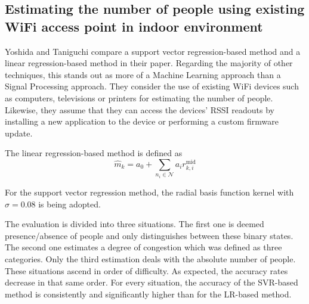 \documentclass[conference]{IEEEtran}
\begin{document}
\subsection{Estimating the number of people using existing WiFi access point in indoor environment}
Yoshida and Taniguchi \cite{Yoshida} compare a support vector regression-based method and a linear regression-based method in their paper. Regarding the majority of other techniques, this stands out as more of a Machine Learning approach than a Signal Processing approach. They consider the use of existing WiFi devices such as computers, televisions or printers for estimating the number of people. Likewise, they assume that they can access the devices' RSSI readouts by installing a new application to the device or performing a custom firmware update.
\par
The linear regression-based method is defined as
\begin{equation*}
	\hat{m}_{k} = a_0 + \sum\limits_{n_i \in \mathcal{N}} a_i r^{\textrm{mid}}_{k,i}
\end{equation*}


For the support vector regression method, the radial basis function kernel with $\sigma = 0.08$ is being adopted.
\par
The evaluation is divided into three situations. The first one is deemed presence/absence of people and only distinguishes between these binary states. The second one estimates a degree of congestion which was defined as three categories. Only the third estimation deals with the absolute number of people. These situations ascend in order of difficulty. As expected, the accuracy rates decrease in that same order. For every situation, the accuracy of the SVR-based method is consistently and significantly higher than for the LR-based method.
\end{document}
